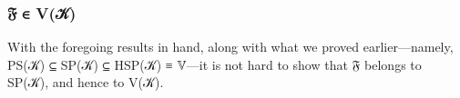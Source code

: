 \documentclass[a4paper,UKenglish,cleveref,autoref,thm-restate]{lipics-v2021}
\begin{document}
\subsubsection{𝔉 ∈ V(𝒦)}\label{sssec:lemma-4}
With the foregoing results in hand, along with what we proved earlier---namely, PS(𝒦) ⊆ SP(𝒦) ⊆ HSP(𝒦) ≡ 𝕍---it is not hard to show that \af 𝔉 belongs to \ad S\ad P(\ab 𝒦), and hence to \ad V(𝒦).
\ccpad
\begin{code}%
\>[1]\AgdaSpace{}%
\AgdaSymbol{:}\AgdaSpace{}%
\AgdaSpace{}%
\AgdaSpace{}%
\AgdaSpace{}%
\AgdaSpace{}%
\AgdaSpace{}%
\AgdaSpace{}%
\AgdaSpace{}%
\AgdaSymbol{(}\AgdaSymbol{\{}\AgdaSymbol{\}\{}\AgdaSymbol{\}}\AgdaSpace{}%
\AgdaSymbol{(}\AgdaSymbol{\{}\AgdaSymbol{\}\{}\AgdaSymbol{\}}\AgdaSpace{}%
\AgdaSymbol{))}\<%
\\
%
\>[1]\AgdaSpace{}%
\AgdaSpace{}%
\AgdaSymbol{=}\AgdaSpace{}%
\AgdaSpace{}%
\AgdaSpace{}%
\AgdaSymbol{(}\AgdaSpace{}%
\AgdaSymbol{)}\<%
\\
\>[1][@{}l@{\AgdaIndent{0}}]%
\>[2]\<%
\\
\>[2][@{}l@{\AgdaIndent{0}}]%
\>[3]\AgdaSpace{}%
\AgdaSymbol{:}\AgdaSpace{}%
\AgdaSpace{}%
\AgdaSpace{}%
\AgdaSymbol{(}\AgdaSymbol{\{}\AgdaSymbol{\}\{}\AgdaSymbol{\}}\AgdaSpace{}%
\AgdaSymbol{(}\AgdaSymbol{\{}\AgdaSymbol{\}\{}\AgdaSymbol{\}}\AgdaSpace{}%
\AgdaSymbol{))}\<%
\\
%
\>[3]\AgdaSpace{}%
\AgdaSymbol{=}\AgdaSpace{}%
\AgdaSymbol{(}\AgdaSpace{}%
\AgdaSymbol{)}\<%
\\
%
\\[\AgdaEmptyExtraSkip]%
%
\>[1]\AgdaSpace{}%
\AgdaSymbol{:}\AgdaSpace{}%
\AgdaSpace{}%
\AgdaSpace{}%
\AgdaSpace{}%
\AgdaSpace{}%
\AgdaSpace{}%
\AgdaSpace{}%
\AgdaSpace{}%
\<%
\\
%
\>[1]\AgdaSpace{}%
\AgdaSpace{}%
\AgdaSymbol{=}\AgdaSpace{}%
\AgdaSpace{}%
\AgdaSymbol{(}\AgdaSpace{}%
\AgdaSymbol{)}\<%
\end{code}
\end{document}
